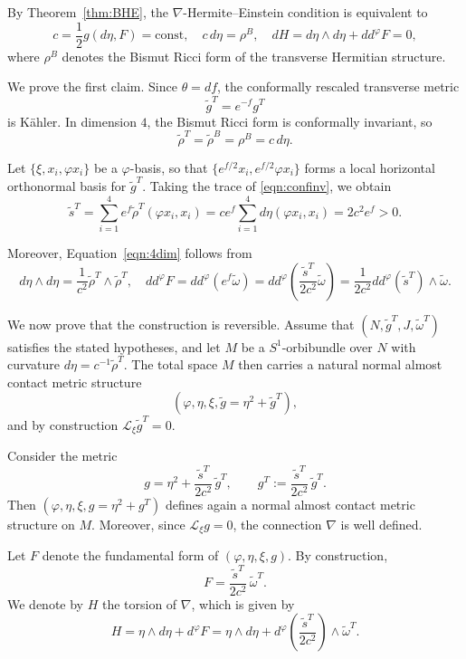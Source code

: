 \documentclass{article}
\makeatletter
\renewenvironment{proof}[1][\proofname]{%
  \par\pushQED{\qed}%
  \normalfont\topsep6\p@\@plus6\p@\relax
  \trivlist
  \item[\hskip\labelsep
        \textbf{\textup{#1}}\@addpunct{.}]\ignorespaces
}{%
  \popQED\endtrivlist\@endpefalse
}
\theoremstyle{definition}
\renewcommand{\phi}{\varphi}
\numberwithin{equation}{section}
\makeatother
\begin{document}
\begin{proof}


By Theorem~\ref{thm:BHE}, the $\nabla$-Hermite--Einstein condition is equivalent to
\[
c = \frac{1}{2} g(d\eta, F) = \text{const}, \quad
c\, d\eta = \rho^B, \quad dH = d\eta \wedge d\eta + dd^\phi F = 0,
\]
where $\rho^B$ denotes the Bismut Ricci form of the transverse Hermitian structure.

\medskip
We prove the first claim. Since $\theta = df$, the conformally rescaled transverse metric
\[
\tilde g^T = e^{-f} g^T
\]
is K\"ahler. In dimension $4$, the Bismut Ricci form is conformally invariant, so
\begin{equation} \label{eqn:confinv}
\tilde \rho^T = \tilde \rho^B = \rho^B = c \, d\eta.
\end{equation}

Let $\{\xi, x_i, \phi x_i\}$ be a $\phi$-basis, so that $\{ e^{f/2} x_i, e^{f/2} \phi x_i \}$ forms a local horizontal orthonormal basis for $\tilde g^T$. Taking the trace of \eqref{eqn:confinv}, we obtain
\[
\tilde s^T = \sum_{i=1}^{4} e^f \tilde \rho^T(\phi x_i, x_i) = c e^f \sum_{i=1}^{4} d\eta(\phi x_i, x_i) = 2 c^2 e^f > 0.
\]

Moreover, Equation~\eqref{eqn:4dim} follows from
\[
d\eta \wedge d\eta = \frac{1}{c^2} \tilde \rho^T \wedge \tilde \rho^T, \quad
dd^\phi F = dd^\phi(e^f \tilde \omega) = dd^\phi\left(\frac{\tilde s^T}{2 c^2} \tilde \omega\right) = \frac{1}{2c^2} dd^\phi(\tilde s^T) \wedge \tilde \omega.
\]

\medskip
We now prove that the construction is reversible.   
Assume that $(N, \tilde g^T, J, \tilde \omega^T)$ satisfies the stated hypotheses, and let $M$ be a $S^1$-orbibundle over $N$ with curvature $d\eta=c^{-1} \tilde{\rho}^T$. The total space $M$ then carries a natural normal almost contact metric structure
\[
(\phi, \eta, \xi, \tilde g = \eta^2 + \tilde g^T),
\]
and by construction $\mathcal{L}_\xi \tilde g^T = 0$.

Consider the metric
\[
g = \eta^2 + \frac{\tilde s^T}{2 c^2}\,\tilde g^T,
\qquad
g^T := \frac{\tilde s^T}{2c^2}\,\tilde g^T.
\]
Then $(\phi, \eta, \xi, g = \eta^2 + g^T)$ defines again a normal almost contact metric structure on $M$. Moreover, since $\mathcal{L}_\xi g = 0$, the connection $\nabla$ is well defined.

Let $F$ denote the fundamental form of $(\phi, \eta, \xi, g)$. By construction,
\[
F = \frac{\tilde s^T}{2c^2}\,\tilde \omega^T.
\]
We denote by $H$ the torsion of $\nabla$, which is given by
\[
H = \eta \wedge d\eta + d^\phi F=\eta \wedge d\eta+ d^\phi \left(\frac{\tilde s^T}{2c^2}\right) \wedge \tilde \omega^T.
\]


\end{proof}
\end{document}
